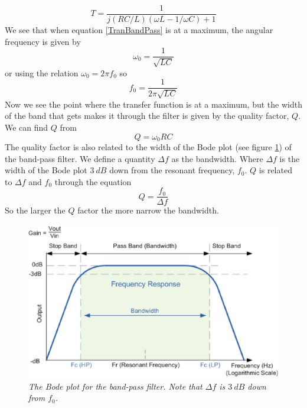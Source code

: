 \documentclass[11pt]{article}
\numberwithin{equation}{section}
\numberwithin{figure}{section}
\numberwithin{table}{section}
\begin{document}
\begin{equation}
T = \frac{1}{j(RC/L)(\omega L - 1/\omega C)+1}
\label{TranBandPass}
\end{equation}
We see that when equation \ref{TranBandPass} is at a maximum, the angular frequency is given by
$$\omega_0 = \frac{1}{\sqrt{LC}}$$ 
or using the relation $\omega_0 = 2\pi f_0$ so
\begin{equation}
f_0 = \frac{1}{2\pi\sqrt{LC}}
\label{BandPassResFreq}
\end{equation}
Now we see the point where the transfer function is at a maximum, but the width of the band that gets makes it through the filter is given by the quality factor, $Q$. We can find $Q$ from
\begin{equation}
Q = \omega_0 RC
\label{QualFact}
\end{equation}
The quality factor is also related to the width of the Bode plot (see figure \ref{BodeBandPass}) of the band-pass filter. We define a quantity $\Delta f$ as the bandwidth. Where $\Delta f$ is the width of the Bode plot $3\ dB$ down from the resonant frequency, $f_0$. $Q$ is related to $\Delta f$ and $f_0$ through the equation
\begin{equation}
Q = \frac{f_0}{\Delta f}
\label{QualDF}
\end{equation}
So the larger the $Q$ factor the more narrow the bandwidth.

\begin{figure}[h]
\centering
\includegraphics[scale=0.65]{BodeBandPass.eps}
\caption{\textit{The Bode plot for the band-pass filter. Note that $\Delta f$ is $3\ dB$ down from $f_0$.}}
\label{BodeBandPass}
\end{figure}
\end{document}
